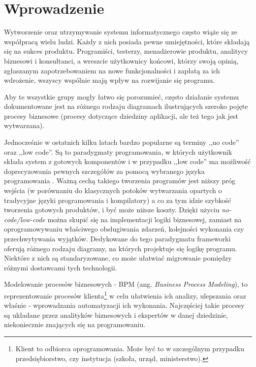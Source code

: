 \documentclass[declaration,shortabstract,mgr]{iithesis}
\author         {Bartłomiej Grochowski}
\date          {}                     %
\begin{document}

\chapter{Wprowadzenie}
Wytworzenie oraz utrzymywanie systemu informatycznego często wiąże się ze współpracą wielu ludzi. Każdy z nich posiada pewne umiejętności, które składają się na sukces produktu. Programiści, testerzy, menadżerowie produktu, analitycy biznesowi i konsultanci, a wreszcie użytkownicy końcowi, którzy swoją opinią, zgłaszanym zapotrzebowaniem na nowe funkcjonalności i zapłatą za ich wdrożenie, wszyscy wspólnie mają wpływ na rozwijanie się programu.

Aby te wszystkie grupy mogły łatwo się porozumieć, często działanie systemu dokumentowane jest na różnego rodzaju diagramach ilustrujących szeroko pojęte procesy biznesowe (procesy dotyczące dziedziny aplikacji, ale też tego jak jest wytwarzana).

Jednocześnie w ostatnich kilku latach bardzo popularne są terminy ,,no code'' oraz ,,low code''. Są to paradygmaty programowania, w których użytkownik składa system z gotowych komponentów i w przypadku ,,low code'' ma możliwość doprecyzowania pewnych szczegółów za pomocą wybranego języka programowania \cite{lowcode-nocode}. Ważną cechą takiego tworzenia programów jest niższy próg wejścia (w porównaniu do klasycznych potoków wytwarzania opartych o tradycyjne języki programowania i kompilatory) a co za tym idzie szybkość tworzenia gotowych produktów, i być może niższe koszty. Dzięki użyciu \textit{no-code/low-code} można skupić się na implementacji logiki biznesowej, zamiast na oprogramowywaniu właściwego obsługiwania zdarzeń, kolejności wykonania czy przechwytywania wyjątków. Dedykowane do tego paradygmatu frameworki oferują różnego rodzaju diagramy, na których projektuje się logikę programu. Niektóre z nich są standaryzowane, co może ułatwiać migrowanie pomiędzy różnymi dostawcami tych technologii.

Modelowanie procesów biznesowych - BPM (ang. \textit{Business Process Modeling}), to reprezentowanie procesów klienta\footnote{Klient to odbiorca oprogramowania. Może być to w szczególnym przypadku przedsiębiorstwo, czy instytucja (szkoła, urząd, ministerstwo).} w celu ułatwienia ich analizy, ulepszania oraz właśnie - wprowadzania automatyzacji \cite{bpm-wiki} ich wykonania. Najczęściej takie procesy są układane przez analityków biznesowych i ekspertów w danej dziedzinie, niekoniecznie znających się na programowaniu.
\end{document}
